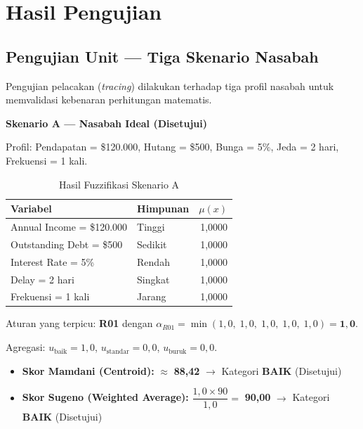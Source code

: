 \documentclass[12pt,a4paper]{report}
\begin{document}
\section{Hasil Pengujian}

\subsection{Pengujian Unit — Tiga Skenario Nasabah}

Pengujian pelacakan (\textit{tracing}) dilakukan terhadap tiga
profil nasabah untuk memvalidasi kebenaran perhitungan matematis.

\vspace{6pt}
\noindent\textbf{Skenario A — Nasabah Ideal (Disetujui)}

\noindent Profil: Pendapatan = \$120.000, Hutang = \$500,
Bunga = 5\%, Jeda = 2 hari, Frekuensi = 1 kali.

\begin{table}[H]
  \centering
  \caption{Hasil Fuzzifikasi Skenario A}
  \label{tab:fuzz_a}
  \small
  \renewcommand{\arraystretch}{1.2}
  \begin{tabular}{|l|l|r|}
    \hline
    \textbf{Variabel} & \textbf{Himpunan} & \textbf{$\mu(x)$} \\
    \hline
    Annual Income   = \$120.000 & Tinggi  & 1,0000 \\
    Outstanding Debt = \$500    & Sedikit & 1,0000 \\
    Interest Rate   = 5\%       & Rendah  & 1,0000 \\
    Delay           = 2 hari    & Singkat & 1,0000 \\
    Frekuensi       = 1 kali    & Jarang  & 1,0000 \\
    \hline
  \end{tabular}
\end{table}

Aturan yang terpicu: \textbf{R01} dengan $\alpha_{R01} =
\min(1{,}0,\; 1{,}0,\; 1{,}0,\; 1{,}0,\; 1{,}0) = \mathbf{1{,}0}$.

Agregasi: $u_{\text{baik}} = 1{,}0$,\;
$u_{\text{standar}} = 0{,}0$,\;
$u_{\text{buruk}} = 0{,}0$.

\begin{itemize}
  \item \textbf{Skor Mamdani (Centroid):} $\approx$ \textbf{88,42}
        $\rightarrow$ Kategori \textbf{BAIK} (Disetujui)
  \item \textbf{Skor Sugeno (Weighted Average):}
        $\dfrac{1{,}0 \times 90}{1{,}0} = $ \textbf{90,00}
        $\rightarrow$ Kategori \textbf{BAIK} (Disetujui)
\end{itemize}
\end{document}
